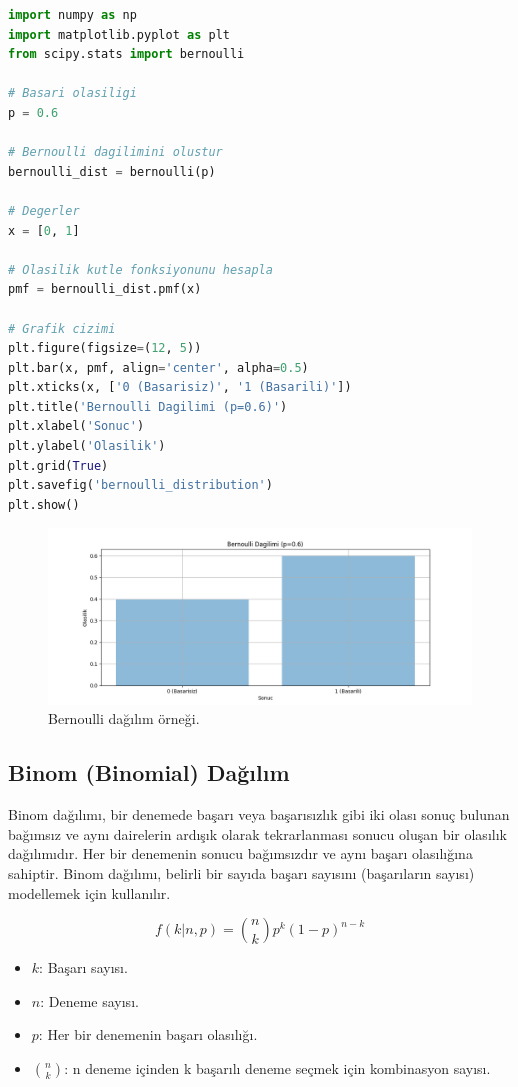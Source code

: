 \begin{lstlisting}[language=Python]
import numpy as np
import matplotlib.pyplot as plt
from scipy.stats import bernoulli

# Basari olasiligi
p = 0.6

# Bernoulli dagilimini olustur
bernoulli_dist = bernoulli(p)

# Degerler
x = [0, 1]

# Olasilik kutle fonksiyonunu hesapla
pmf = bernoulli_dist.pmf(x)

# Grafik cizimi
plt.figure(figsize=(12, 5))
plt.bar(x, pmf, align='center', alpha=0.5)
plt.xticks(x, ['0 (Basarisiz)', '1 (Basarili)'])
plt.title('Bernoulli Dagilimi (p=0.6)')
plt.xlabel('Sonuc')
plt.ylabel('Olasilik')
plt.grid(True)
plt.savefig('bernoulli_distribution')
plt.show()
\end{lstlisting}

\newpage

\begin{figure}[h]
    \centering
    \includegraphics[width=1\textwidth]{images/bernoulli_distribution.png}
    \caption{Bernoulli dağılım örneği.}
    \label{fig:enter-label}
\end{figure}

\subsection{Binom (Binomial) Dağılım}
Binom dağılımı, bir denemede başarı veya başarısızlık gibi iki olası sonuç bulunan bağımsız ve aynı dairelerin ardışık olarak tekrarlanması sonucu oluşan bir olasılık dağılımıdır. Her bir denemenin sonucu bağımsızdır ve aynı başarı olasılığına sahiptir. Binom dağılımı, belirli bir sayıda başarı sayısını (başarıların sayısı) modellemek için kullanılır.

\[f(k|n,p) = \binom{n}{k} p^k (1-p)^{n-k}\]
\begin{itemize}
	\item $k$: Başarı sayısı.
	\item $n$: Deneme sayısı.
	\item $p$: Her bir denemenin başarı olasılığı.
	\item $\binom{n}{k}$: n deneme içinden k başarılı deneme seçmek için kombinasyon sayısı.
\end{itemize}

